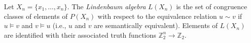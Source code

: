 Let $X_n = \{x_1, \ldots, x_n\}$. The \emph{Lindenbaum algebra} $L(X_n)$ is the set of congruence classes of elements of $P(X_n)$ with respect to the equivalence relation $u \sim v$ if $u \models v$ and $v \models u$ (i.e., $u$ and $v$ are semantically equivalent). Elements of $L(X_n)$ are identified with their associated truth functions $\mathbb{Z}_2^n \to \mathbb{Z}_2$.
